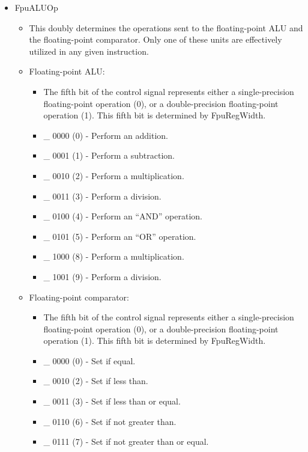 \documentclass[
    paper=letter,
    parskip=half,
    fontsize=12pt,
    titlepage=firstiscover,
    toc=bibliography,
    numbers=endperiod
]{scrartcl}
\providecommand{\tightlist}{%
  \setlength{\itemsep}{0pt}\setlength{\parskip}{0pt}}
\begin{document}
\begin{itemize}
    \item FpuALUOp
          \begin{itemize}
              \tightlist
              \item This doubly determines the operations sent to the floating-point ALU and
                    the floating-point comparator. Only one of these units are effectively
                    utilized in any given instruction.
              \item Floating-point ALU:
                    \begin{itemize}
                        \tightlist
                        \item The fifth bit of the control signal represents either a single-precision
                              floating-point operation (0), or a double-precision floating-point
                              operation (1). This fifth bit is determined by FpuRegWidth.
                        \item \_ 0000 (0) - Perform an addition.
                        \item \_ 0001 (1) - Perform a subtraction.
                        \item \_ 0010 (2) - Perform a multiplication.
                        \item \_ 0011 (3) - Perform a division.
                        \item \_ 0100 (4) - Perform an ``AND'' operation.
                        \item \_ 0101 (5) - Perform an ``OR'' operation.
                        \item \_ 1000 (8) - Perform a multiplication.
                        \item \_ 1001 (9) - Perform a division.
                    \end{itemize}
              \item Floating-point comparator:
                    \begin{itemize}
                        \tightlist
                        \item The fifth bit of the control signal represents either a single-precision
                              floating-point operation (0), or a double-precision floating-point
                              operation (1). This fifth bit is determined by FpuRegWidth.
                        \item \_ 0000 (0) - Set if equal.
                        \item \_ 0010 (2) - Set if less than.
                        \item \_ 0011 (3) - Set if less than or equal.
                        \item \_ 0110 (6) - Set if not greater than.
                        \item \_ 0111 (7) - Set if not greater than or equal.
                    \end{itemize}
          \end{itemize}


\end{itemize}
\end{document}
